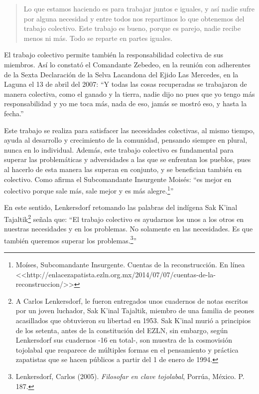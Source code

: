 \documentclass[oneside]{book}
\begin{document}
\begin{quote}
Lo que estamos haciendo es para trabajar juntos e iguales, y así nadie sufre por alguna necesidad y entre todos nos repartimos lo que obtenemos del trabajo colectivo. Este trabajo es bueno, porque es parejo, nadie recibe menos ni más. Todo se reparte en partes iguales.
\end{quote}

El trabajo colectivo permite también la responsabilidad colectiva de sus miembros. Así lo constató el Comandante Zebedeo, en la reunión con adherentes de la Sexta Declaración de la Selva Lacandona del Ejido Las Mercedes, en la Laguna el 13 de abril del 2007: “Y todas las cosas recuperadas se trabajaron de manera colectiva, como el ganado y la tierra, nadie dijo no pues que yo tengo más responsabilidad y yo me toca más, nada de eso, jamás se mostró eso, y hasta la fecha.”

Este trabajo se realiza para satisfacer las necesidades colectivas, al mismo tiempo, ayuda al desarrollo y crecimiento de la comunidad, pensando siempre en plural, nunca en lo individual. Además, este trabajo colectivo es fundamental para superar las problemáticas y adversidades a las que se enfrentan los pueblos, pues al hacerlo de esta manera las superan en conjunto, y se benefician también en colectivo. Como afirma el Subcomandante Insurgente Moisés: “es mejor en colectivo porque sale más, sale mejor y es más alegre.\footnote{Moíses, Subcomandante Insurgente. Cuentas de la reconstrucción. En línea <<http://enlacezapatista.ezln.org.mx/2014/07/07/cuentas-de-la-reconstruccion/>>}”
	
En este sentido, Lenkersdorf retomando las palabras del indígena Sak K'inal Tajaltik\footnote{A Carlos Lenkersdorf, le fueron entregados unos cuadernos de notas escritos por un joven luchador, Sak K’inal Tajaltik, miembro de una familia de peones acasillados que obtuvieron su libertad en 1953. Sak K’inal murió a principios de los setenta, antes de la constitución del EZLN, sin embargo, según Lenkersdorf sus cuadernos -16 en total-, son muestra de la cosmovisión tojolabal que reaparece de múltiples formas en el pensamiento y práctica zapatistas que se hacen públicos a partir del 1 de enero de 1994.} señala que: ``El trabajo colectivo es ayudarnos los unos a los otros en nuestras necesidades y en los problemas. No solamente en las necesidades. Es que también queremos superar los problemas.\footnote{Lenkersdorf, Carlos (2005). \textit{Filosofar en clave tojolabal}, Porrúa, México. P. 187.}''
\end{document}
